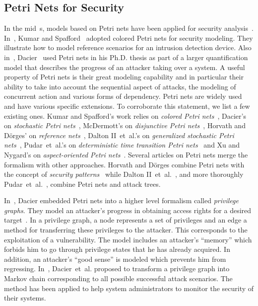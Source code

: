 \documentclass[a4paper]{article}
\begin{document}
\subsection{Petri Nets for Security}

In the mid~s, models based on Petri nets have been applied for security 
analysis~\cite{KuSp,Dacier1994}. In~, Kumar and Spafford~\cite{KuSp}
adopted colored Petri nets for  security  modeling. They illustrate how to model
reference scenarios for an intrusion  detection device. Also in~,
Dacier~\cite{Dacier1994} used Petri nets in  his  Ph.D. thesis as part of a
larger quantification model that describes the progress of an attacker taking
over a system. A useful property of Petri nets  is their great modeling
capability and in particular their ability to take into  account the sequential
aspect of attacks, the modeling of concurrent action and  various forms of
dependency. Petri nets are widely used and have various  specific extensions. To
corroborate this statement,  we list a few existing ones. Kumar and Spafford's
work relies on \emph{colored Petri nets}~\cite{KuSp}, Dacier's on
\emph{stochastic Petri nets}~\cite{Dacier1994}, McDermott's on \emph{disjunctive
Petri  nets}~\cite{McDe}, Horvath and D\"{o}rges' on \emph{reference
nets}~\cite{HoDo}, Dalton II~et~al.'s on \emph{generalized stochastic Petri 
nets}~\cite{DaMiCoRa}, Pudar~et~al.'s on \emph{deterministic time transition 
Petri nets}~\cite{PuMaLi} and Xu and Nygard's on \emph{aspect-oriented Petri 
nets}~\cite{XuNy}. Several articles on Petri nets merge the formalism with 
other approaches. Horvath and D\"{o}rges combine Petri nets with the concept of 
\emph{security patterns}~\cite{HoDo} while Dalton II~et~al.~\cite{DaMiCoRa}, and
more thoroughly Pudar~et~al.~\cite{PuMaLi}, combine Petri nets and attack 
trees. 

In~, Dacier embedded Petri nets into a higher level formalism called
\emph{privilege graphs}. They model an attacker's progress in obtaining access
rights for a desired target~\cite{Dacier1994,DaDe}.  In a privilege graph, a
node represents a set of privileges and an edge a method for transferring these
privileges to the attacker. This corresponds to the exploitation of a
vulnerability. The model includes an attacker's ``memory''  which forbids him to
go through privilege states that he has already acquired.  In addition, an
attacker's ``good sense'' is modeled which prevents him from  regressing.
In~\cite{DaDeKa}, Dacier~et~al. proposed to transform a privilege  graph into
Markov chain corresponding to all possible successful  attack scenarios. The
method has been applied to help  system administrators to monitor the security
of their systems.
\end{document}
